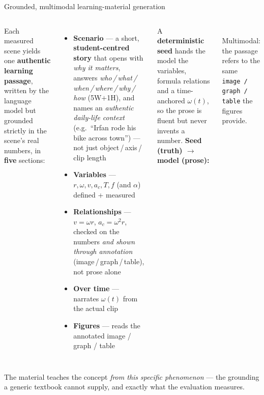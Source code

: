 \documentclass[aspectratio=169,10pt]{beamer}
\newcommand{\hl}[1]{{\bfseries\color{cAccent}#1}}
\begin{document}
\begin{frame}{Grounded, multimodal learning-material generation}
\begin{columns}[T]
\small
Each measured scene yields one \hl{authentic learning passage}, written by the language model
but grounded strictly in the scene's real numbers, in \hl{five} sections:
\begin{itemize}\setlength\itemsep{1pt}
  \item \textbf{Scenario} --- a short, \hl{student-centred story} that opens with \emph{why it
  matters}, answers \emph{who\,/\,what\,/\,when\,/\,where\,/\,why\,/\,how} (5W$+$1H), and names an
  \emph{authentic daily-life context} (e.g.\ ``Irfan rode his bike across town'') --- not just object\,/\,axis\,/\,clip length
  \item \textbf{Variables} --- $r,\omega,v,a_c,T,f$ (and $\alpha$) defined + measured
  \item \textbf{Relationships} --- $v=\omega r$, $a_c=\omega^2 r$, checked on the numbers \emph{and shown through annotation} (image\,/\,graph\,/\,table), not prose alone
  \item \textbf{Over time} --- narrates $\omega(t)$ from the actual clip
  \item \textbf{Figures} --- reads the annotated image / graph / table
\end{itemize}
A \textbf{deterministic seed} hands the model the variables, formula relations and a
time-anchored $\omega(t)$, so the prose is fluent but \alert{never invents a number}.
\centering
{\footnotesize \textbf{Seed (truth) $\to$ model (prose):}}\\[4pt]
\\[4pt]
{\scriptsize Multimodal: the passage refers to the same \texttt{image\,/\,graph\,/\,table} the figures provide.}
\end{columns}
\vspace{-0.2em}
{\scriptsize The material teaches the concept \emph{from this specific phenomenon} --- the grounding a generic textbook cannot supply, and exactly what the evaluation measures.}
\end{frame}
\end{document}
